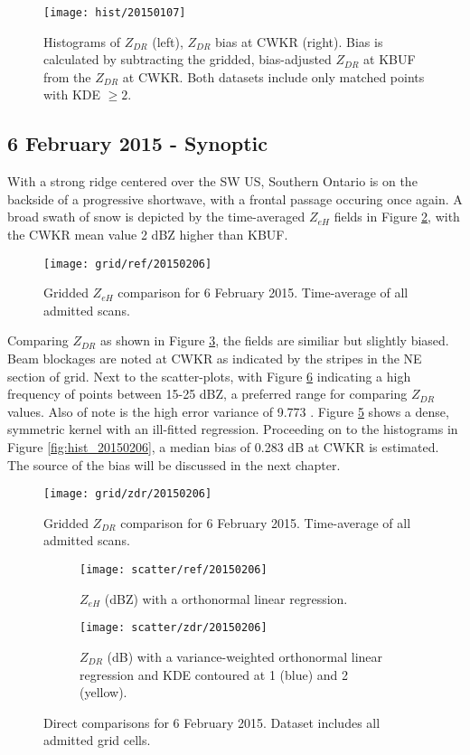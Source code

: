 \begin{figure}[H]
\texttt{[image: hist/20150107]}\centering
\caption{Histograms of $Z_{DR}$ (left), $Z_{DR}$ bias at CWKR (right). Bias is calculated by subtracting the gridded, bias-adjusted $Z_{DR}$ at KBUF from the
$Z_{DR}$ at CWKR. Both datasets include only matched points with KDE $\geq 2$.} 
\label{fig:hist_20150107}
\end{figure}

\subsection{6 February 2015 - Synoptic}
With a strong ridge centered over the SW US, Southern Ontario is on the backside of a progressive shortwave, with a frontal passage occuring once again. A
broad swath of snow is depicted by the time-averaged $Z_{eH}$ fields in Figure \ref{fig:grid_ref_20150206}, with the CWKR mean value 2 dBZ higher than KBUF.
\begin{figure}[H]
\texttt{[image: grid/ref/20150206]}
\caption{Gridded $Z_{eH}$ comparison for 6 February 2015. Time-average of all admitted scans.} 
\label{fig:grid_ref_20150206}
\end{figure}
Comparing $Z_{DR}$ as shown in Figure \ref{fig:grid_zdr_20150206}, the fields are similiar but slightly biased. Beam blockages are noted at CWKR as indicated
by the stripes in the NE section of grid. Next to the scatter-plots, with Figure \ref{fig:scatter_20150206} indicating a high
frequency of points between 15-25 dBZ, a preferred range for comparing $Z_{DR}$ values. Also of note is the high error variance of 9.773 .
Figure \ref{fig:scatter_zdr_20150206} shows a dense, symmetric kernel with an ill-fitted regression. Proceeding on to the histograms in Figure
\ref{fig:hist_20150206}, a median bias of 0.283 dB at CWKR is estimated. The source of the bias will be discussed in the next chapter. 

\begin{figure}[p]
\texttt{[image: grid/zdr/20150206]}
\caption{Gridded $Z_{DR}$ comparison for 6 February 2015. Time-average of all admitted scans.} 
\label{fig:grid_zdr_20150206}
\end{figure}

\begin{figure}[p]
\centering
   \begin{subfigure}[t]{0.48\linewidth} \centering
     \texttt{[image: scatter/ref/20150206]}
     \caption{$Z_{eH}$ (dBZ) with a orthonormal linear regression.}\label{fig:scatter_ref_20150206}
   \end{subfigure}
   \begin{subfigure}[t]{0.48\linewidth} \centering
     \texttt{[image: scatter/zdr/20150206]}
     \caption{$Z_{DR}$ (dB) with a variance-weighted orthonormal linear regression and KDE contoured at 1 (blue) and 2 (yellow).}\label{fig:scatter_zdr_20150206}
   \end{subfigure}
\caption{Direct comparisons for 6 February 2015. Dataset includes all admitted grid cells.} \label{fig:scatter_20150206}
\end{figure}

